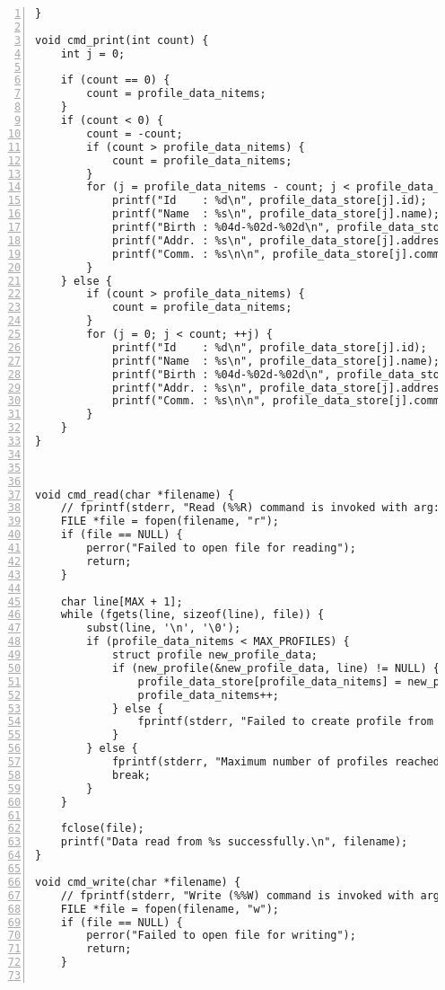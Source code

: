 \begin{Verbatim}[numbers=left, xleftmargin=10mm, numbersep=6pt,
                    fontsize=\small, baselinestretch=0.8]
}

void cmd_print(int count) {
    int j = 0;

    if (count == 0) {
        count = profile_data_nitems;
    }
    if (count < 0) {
        count = -count;
        if (count > profile_data_nitems) {
            count = profile_data_nitems;
        }
        for (j = profile_data_nitems - count; j < profile_data_nitems; ++j) {
            printf("Id    : %d\n", profile_data_store[j].id);
            printf("Name  : %s\n", profile_data_store[j].name);
            printf("Birth : %04d-%02d-%02d\n", profile_data_store[j].birthday.y, profile_data_store[j].birthday.m, profile_data_store[j].birthday.d);
            printf("Addr. : %s\n", profile_data_store[j].address);
            printf("Comm. : %s\n\n", profile_data_store[j].comment);
        }
    } else {
        if (count > profile_data_nitems) {
            count = profile_data_nitems;
        }
        for (j = 0; j < count; ++j) {
            printf("Id    : %d\n", profile_data_store[j].id);
            printf("Name  : %s\n", profile_data_store[j].name);
            printf("Birth : %04d-%02d-%02d\n", profile_data_store[j].birthday.y, profile_data_store[j].birthday.m, profile_data_store[j].birthday.d);
            printf("Addr. : %s\n", profile_data_store[j].address);
            printf("Comm. : %s\n\n", profile_data_store[j].comment);
        }
    }
}



void cmd_read(char *filename) {
    // fprintf(stderr, "Read (%%R) command is invoked with arg: '%s'\n", filename);
    FILE *file = fopen(filename, "r");
    if (file == NULL) {
        perror("Failed to open file for reading");
        return;
    }

    char line[MAX + 1];
    while (fgets(line, sizeof(line), file)) {
        subst(line, '\n', '\0');
        if (profile_data_nitems < MAX_PROFILES) {
            struct profile new_profile_data;
            if (new_profile(&new_profile_data, line) != NULL) {
                profile_data_store[profile_data_nitems] = new_profile_data;
                profile_data_nitems++;
            } else {
                fprintf(stderr, "Failed to create profile from line: %s\n", line);
            }
        } else {
            fprintf(stderr, "Maximum number of profiles reached.\n");
            break;
        }
    }

    fclose(file);
    printf("Data read from %s successfully.\n", filename);
}

void cmd_write(char *filename) {
    // fprintf(stderr, "Write (%%W) command is invoked with arg: '%s'\n", filename);
    FILE *file = fopen(filename, "w");
    if (file == NULL) {
        perror("Failed to open file for writing");
        return;
    }


\end{Verbatim}

